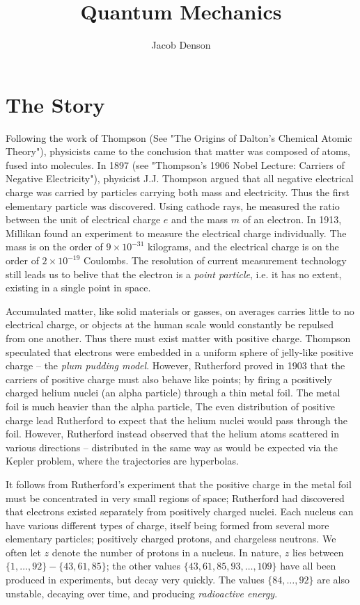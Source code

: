 

\title{Quantum Mechanics}
\author{Jacob Denson}



\chapter{The Story}

Following the work of Thompson (See "The Origins of Dalton's Chemical Atomic Theory"), physicists came to the conclusion that matter was composed of atoms, fused into molecules. In 1897 (see "Thompson's 1906 Nobel Lecture: Carriers of Negative Electricity"), physicist J.J. Thompson argued that all negative electrical charge was carried by particles carrying both mass and electricity. Thus the first elementary particle was discovered. Using cathode rays, he measured the ratio between the unit of electrical charge $e$ and the mass $m$ of an electron. In 1913, Millikan found an experiment to measure the electrical charge individually. The mass is on the order of $9 \times 10^{-31}$ kilograms, and the electrical charge is on the order of $2 \times 10^{-19}$ Coulombs. The resolution of current measurement technology still leads us to belive that the electron is a \emph{point particle}, i.e. it has no extent, existing in a single point in space.


Accumulated matter, like solid materials or gasses, on averages carries little to no electrical charge, or objects at the human scale would constantly be repulsed from one another. Thus there must exist matter with positive charge. Thompson speculated that electrons were embedded in a uniform sphere of jelly-like positive charge -- the \emph{plum pudding model}. However, Rutherford proved in 1903 that the carriers of positive charge must also behave like points; by firing a positively charged helium nuclei (an alpha particle) through a thin metal foil. The metal foil is much heavier than the alpha particle, The even distribution of positive charge lead Rutherford to expect that the helium nuclei would pass through the foil. However, Rutherford instead observed that the helium atoms scattered in various directions -- distributed in the same way as would be expected via the Kepler problem, where the trajectories are hyperbolas.

It follows from Rutherford's experiment that the positive charge in the metal foil must be concentrated in very small regions of space; Rutherford had discovered that electrons existed separately from positively charged nuclei. Each nucleus can have various different types of charge, itself being formed from several more elementary particles; positively charged protons, and chargeless neutrons. We often let $z$ denote the number of protons in a nucleus. In nature, $z$ lies between $\{ 1, \dots, 92 \} - \{ 43, 61, 85 \}$; the other values $\{ 43, 61, 85, 93, \dots, 109 \}$ have all been produced in experiments, but decay very quickly. The values $\{ 84, \dots, 92 \}$ are also unstable, decaying over time, and producing \emph{radioactive energy}.

